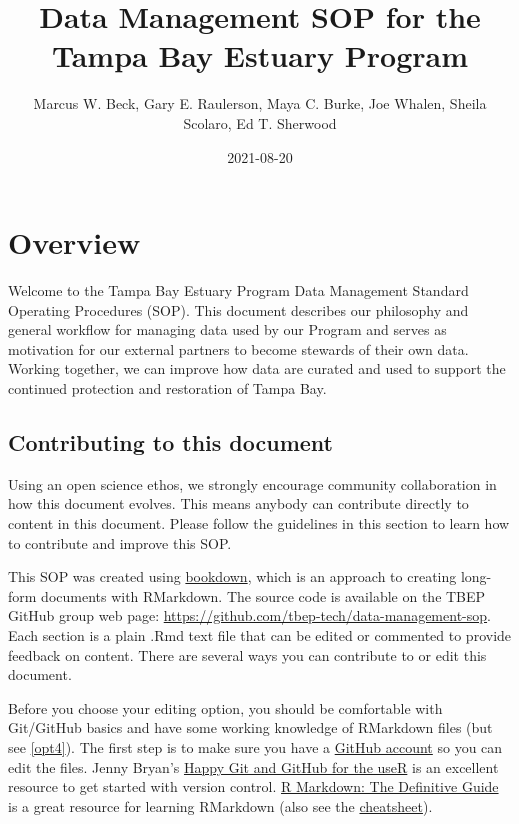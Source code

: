 \documentclass[
]{book}
\title{Data Management SOP for the Tampa Bay Estuary Program}
\author{Marcus W. Beck, Gary E. Raulerson, Maya C. Burke, Joe Whalen, Sheila Scolaro, Ed T. Sherwood}
\date{2021-08-20}
\begin{document}
\maketitle

{
\hypersetup{linkcolor=}
\setcounter{tocdepth}{1}
\tableofcontents
}
\hypertarget{overview}{%
\chapter{Overview}\label{overview}}

Welcome to the Tampa Bay Estuary Program Data Management Standard Operating Procedures (SOP). This document describes our philosophy and general workflow for managing data used by our Program and serves as motivation for our external partners to become stewards of their own data. Working together, we can improve how data are curated and used to support the continued protection and restoration of Tampa Bay.

\hypertarget{contrib}{%
\section{Contributing to this document}\label{contrib}}

Using an open science ethos, we strongly encourage community collaboration in how this document evolves. This means anybody can contribute directly to content in this document. Please follow the guidelines in this section to learn how to contribute and improve this SOP.

This SOP was created using \href{https://bookdown.org/}{bookdown}, which is an approach to creating long-form documents with RMarkdown. The source code is available on the TBEP GitHub group web page: \url{https://github.com/tbep-tech/data-management-sop}. Each section is a plain .Rmd text file that can be edited or commented to provide feedback on content. There are several ways you can contribute to or edit this document.

Before you choose your editing option, you should be comfortable with Git/GitHub basics and have some working knowledge of RMarkdown files (but see \ref{opt4}). The first step is to make sure you have a \href{https://github.com/join}{GitHub account} so you can edit the files. Jenny Bryan's \href{https://happygitwithr.com/}{Happy Git and GitHub for the useR} is an excellent resource to get started with version control. \href{https://bookdown.org/yihui/rmarkdown/}{R Markdown: The Definitive Guide} is a great resource for learning RMarkdown (also see the \href{https://rstudio.com/wp-content/uploads/2015/03/rmarkdown-reference.pdf}{cheatsheet}).
\end{document}
